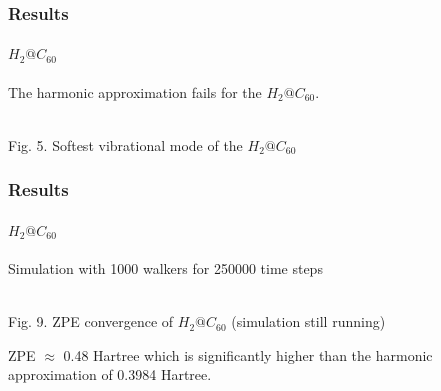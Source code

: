 \documentclass[16pt]{beamer}
\begin{document}
\begin{frame}
\frametitle{Results}
\framesubtitle{$H_2@C_{60}$}
The harmonic approximation fails for the $H_2@C_{60}$.
\begin{center}
\\
Fig. 5. Softest vibrational mode of the  $H_2@C_{60}$
\end{center}
\end{frame}

\begin{frame}
\frametitle{Results}
\framesubtitle{$H_2@C_{60}$}
Simulation with 1000 walkers for 250000 time steps
\begin{center}
\\
Fig. 9. ZPE convergence of $H_2@C_{60}$ (simulation still running)
\end{center}
ZPE $\approx$ 0.48 Hartree which is significantly higher than the harmonic approximation of 0.3984 Hartree.

\end{frame}
\end{document}
